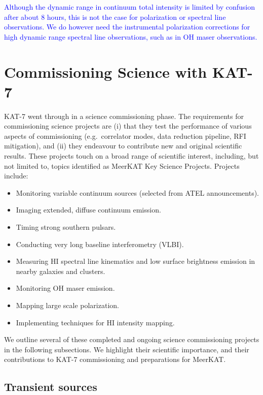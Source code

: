 \textcolor{blue}{ Although the dynamic range in continuum total
  intensity is limited by confusion after about 8 hours, this is not
  the case for polarization or spectral line observations. We do
  however need the instrumental polarization corrections for high
  dynamic range spectral line observations, such as in OH maser
  observations.}


\section{Commissioning Science with KAT-7}
\label{sec:comm}

\noindent
KAT-7 went through in a science commissioning phase.  The requirements
for commissioning science projects are (i) that they test the
performance of various aspects of commissioning (e.g.~correlator
modes, data reduction pipeline, RFI mitigation), and (ii) they
endeavour to contribute new and original scientific results.  These
projects touch on a broad range of scientific interest, including, but
not limited to, topics identified as MeerKAT Key Science Projects.
Projects include:

\begin{itemize}
\item Monitoring variable continuum sources (selected from ATEL
  announcements).
\item Imaging extended, diffuse continuum emission.
\item Timing strong southern pulsars.
\item Conducting very long baseline interferometry (VLBI).
\item Measuring HI spectral line kinematics and low surface brightness emission in nearby galaxies and clusters.
\item Monitoring OH maser emission.
\item Mapping large scale polarization.
\item Implementing techniques for HI intensity mapping.
\end{itemize}

\noindent
We outline several of these completed and ongoing science
commissioning projects in the following subsections.  We highlight
their scientific importance, and their contributions to KAT-7
commissioning and preparations for MeerKAT.

\subsection{Transient sources}

